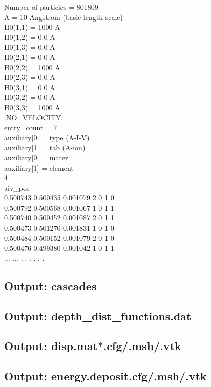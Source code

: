 Number of particles = 801809\\
A = 10 Angstrom (basic length-scale)\\
H0(1,1) = 1000 A\\
H0(1,2) = 0.0 A\\
H0(1,3) = 0.0 A\\
H0(2,1) = 0.0 A\\
H0(2,2) = 1000 A\\
H0(2,3) = 0.0 A\\
H0(3,1) = 0.0 A\\
H0(3,2) = 0.0 A\\
H0(3,3) = 1000 A\\
.NO\_VELOCITY.\\
entry\_count = 7\\
auxiliary[0] = type (A-I-V)\\
auxiliary[1] = tab (A-ion)\\
auxiliary[0] = mater\\
auxiliary[1] = element\\
4\\
aiv\_pos\\
0.500743	0.500435	0.001079	2	0	1	0\\
0.500792	0.500568	0.001067	1	0	1	1\\
0.500740	0.500452	0.001087	2	0	1	1\\
0.500473	0.501270	0.001831	1	0	1	0\\
0.500484	0.500152	0.001079	2	0	1	0\\
0.500476	0.499380	0.001042	1	0	1	1\\
...         ...         ...         .   .   .   .

\subsection{Output: cascades}

\subsection{Output: depth\_dist\_functions.dat}

\subsection{Output: disp.mat$*$.cfg/.msh/.vtk}

\subsection{Output: energy.deposit.cfg/.msh/.vtk}

